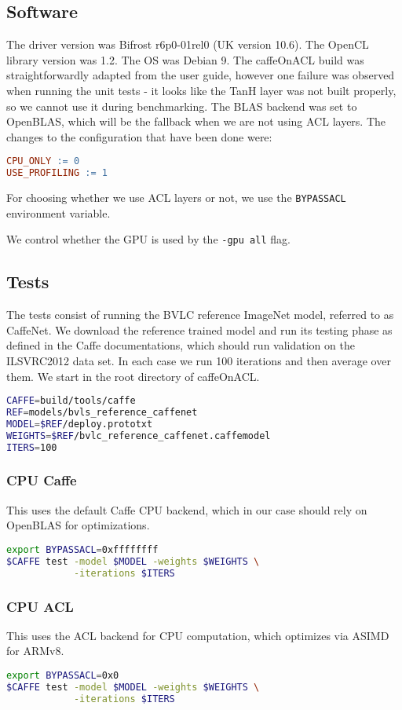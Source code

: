 \documentclass[12pt, a4paper, notitlepage]{report}
\begin{document}
\subsection*{Software}
The driver version was Bifrost r6p0-01rel0 (UK version 10.6).
The OpenCL library version was 1.2.
The OS was Debian 9.
The caffeOnACL build was straightforwardly adapted from the user guide, however one failure was observed when running the unit tests - it looks like the TanH layer was not built properly, so we cannot use it during benchmarking. The BLAS backend was set to OpenBLAS, which will be the fallback when we are not using ACL layers. The changes to the configuration that have been done were:
\begin{lstlisting}[language=make]
CPU_ONLY := 0
USE_PROFILING := 1
\end{lstlisting}

For choosing whether we use ACL layers or not, we use the \verb|BYPASSACL| environment variable.

We control whether the GPU is used by the \verb|-gpu all| flag.\cite{coacl}

\subsection*{Tests}
The tests consist of running the BVLC reference ImageNet model, referred to as CaffeNet. We download the reference trained model and run its testing phase as defined in the Caffe documentations, which should run validation on the ILSVRC2012 data set. In each case we run 100 iterations and then average over them.\cite{caffe}
We start in the root directory of caffeOnACL.
\begin{lstlisting}[language=bash]
CAFFE=build/tools/caffe
REF=models/bvls_reference_caffenet
MODEL=$REF/deploy.prototxt
WEIGHTS=$REF/bvlc_reference_caffenet.caffemodel
ITERS=100
\end{lstlisting}
\subsubsection*{CPU Caffe}
This uses the default Caffe CPU backend, which in our case should rely on OpenBLAS for optimizations.
\begin{lstlisting}[language=bash]
export BYPASSACL=0xffffffff
$CAFFE test -model $MODEL -weights $WEIGHTS \
            -iterations $ITERS
\end{lstlisting}

\subsubsection*{CPU ACL}
This uses the ACL backend for CPU computation, which optimizes via ASIMD for ARMv8.\cite{acl}
\begin{lstlisting}[language=bash]
export BYPASSACL=0x0
$CAFFE test -model $MODEL -weights $WEIGHTS \
            -iterations $ITERS
\end{lstlisting}
\end{document}
